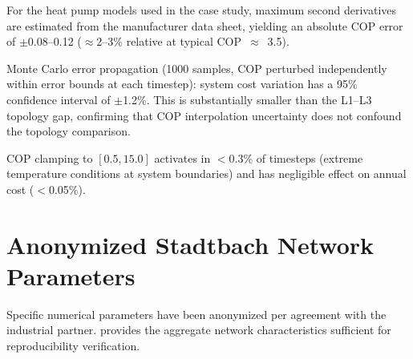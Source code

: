 \documentclass[review,3p]{elsarticle}
\begin{document}
For the heat pump models used in the case study, maximum second
derivatives are estimated from the manufacturer data sheet, yielding
an absolute COP error of $\pm$0.08--0.12 ($\approx$2--3\% relative
at typical COP~$\approx$~3.5).

Monte Carlo error propagation (1000 samples, COP perturbed independently
within error bounds at each timestep): system cost variation has a 95\%
confidence interval of $\pm$1.2\%. This is substantially smaller than
the L1--L3 topology gap, confirming that COP interpolation uncertainty
does not confound the topology comparison.

COP clamping to $[0.5, 15.0]$ activates in $<$0.3\% of timesteps
(extreme temperature conditions at system boundaries) and has negligible
effect on annual cost ($<$0.05\%).

\section{Anonymized Stadtbach Network Parameters}
\label{app:stadtbach}

Specific numerical parameters have been anonymized per agreement
with the industrial partner.  provides the
aggregate network characteristics sufficient for reproducibility
verification.
\end{document}

